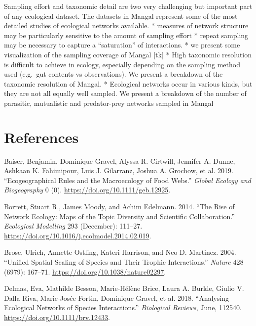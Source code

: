 Sampling effort and taxonomic detail are two very challenging but
important part of any ecological dataset. The datasets in Mangal
represent some of the most detailed studies of ecological networks
available. * measures of network structure may be particularly sensitive
to the amount of sampling effort * repeat sampling may be necessary to
capture a ``saturation'' of interactions. * we present some
visualization of the sampling coverage of Mangal {[}tk{]} * High
taxonomic resolution is difficult to achieve in ecology, especially
depending on the sampling method used (e.g.~gut contents vs
observations). We present a breakdown of the taxonomic resolution of
Mangal. * Ecological networks occur in various kinds, but they are not
all equally well sampled. We present a breakdown of the number of
parasitic, mutualistic and predator-prey networks sampled in Mangal

\hypertarget{references}{%
\section*{References}\label{references}}

\hypertarget{refs}{}
\leavevmode\hypertarget{ref-BaisGrav19}{}%
Baiser, Benjamin, Dominique Gravel, Alyssa R. Cirtwill, Jennifer A.
Dunne, Ashkaan K. Fahimipour, Luis J. Gilarranz, Joshua A. Grochow, et
al. 2019. ``Ecogeographical Rules and the Macroecology of Food Webs.''
\emph{Global Ecology and Biogeography} 0 (0).
\url{https://doi.org/10.1111/geb.12925}.

\leavevmode\hypertarget{ref-BorrMood14}{}%
Borrett, Stuart R., James Moody, and Achim Edelmann. 2014. ``The Rise of
Network Ecology: Maps of the Topic Diversity and Scientific
Collaboration.'' \emph{Ecological Modelling} 293 (December): 111--27.
\url{https://doi.org/10.1016/j.ecolmodel.2014.02.019}.

\leavevmode\hypertarget{ref-BrosOstl04}{}%
Brose, Ulrich, Annette Ostling, Kateri Harrison, and Neo D. Martinez.
2004. ``Unified Spatial Scaling of Species and Their Trophic
Interactions.'' \emph{Nature} 428 (6979): 167--71.
\url{https://doi.org/10.1038/nature02297}.

\leavevmode\hypertarget{ref-DelmBess18}{}%
Delmas, Eva, Mathilde Besson, Marie-Hélène Brice, Laura A. Burkle,
Giulio V. Dalla Riva, Marie-Josée Fortin, Dominique Gravel, et al. 2018.
``Analysing Ecological Networks of Species Interactions.''
\emph{Biological Reviews}, June, 112540.
\url{https://doi.org/10.1111/brv.12433}.

